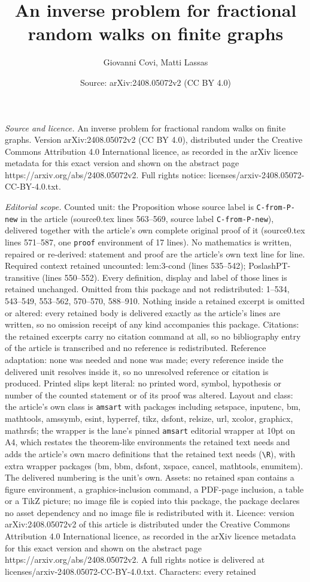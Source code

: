 \documentclass[10pt,a4paper]{amsart}
\title[An inverse problem for fractional random walks on finite gra]{An inverse problem for fractional random walks on finite graphs}
\author{Giovanni Covi, Matti Lassas}
\date{Source: arXiv:2408.05072v2 (CC BY 4.0)}
\begin{document}
\maketitle

\noindent\emph{Source and licence.} An inverse problem for fractional random walks on finite graphs. Version arXiv:2408.05072v2 (CC BY 4.0), distributed under the Creative Commons Attribution 4.0 International licence, as recorded in the arXiv licence metadata for this exact version and shown on the abstract page https://arxiv.org/abs/2408.05072v2. Full rights notice: licenses/arxiv-2408.05072-CC-BY-4.0.txt.\par\smallskip

\noindent\textit{Editorial scope.} Counted unit: the Proposition whose source label is \texttt{C-from-P-new} in the article (source0.tex lines 563--569, source label \texttt{C-from-P-new}), delivered together with the article's own complete original proof of it (source0.tex lines 571--587, one \texttt{proof} environment of 17 lines). No mathematics is written, repaired or re-derived: statement and proof are the article's own text line for line. Required context retained uncounted: lem:3-cond (lines 535--542); PoslashPT-transitive (lines 550--552). Every definition, display and label of those lines is retained unchanged. Omitted from this package and not redistributed: 1--534, 543--549, 553--562, 570--570, 588--910. Nothing inside a retained excerpt is omitted or altered: every retained body is delivered exactly as the article's lines are written, so no omission receipt of any kind accompanies this package. Citations: the retained excerpts carry no citation command at all, so no bibliography entry of the article is transcribed and no reference is redistributed. Reference adaptation: none was needed and none was made; every reference inside the delivered unit resolves inside it, so no unresolved reference or citation is produced. Printed slips kept literal: no printed word, symbol, hypothesis or number of the counted statement or of its proof was altered. Layout and class: the article's own class is \texttt{amsart} with packages including setspace, inputenc, bm, mathtools, amssymb, esint, hyperref, tikz, dsfont, relsize, url, xcolor, graphicx, mathrsfs; the wrapper is the lane's pinned \texttt{amsart} editorial wrapper at 10pt on A4, which restates the theorem-like environments the retained text needs and adds the article's own macro definitions that the retained text needs (\texttt{\textbackslash R}), with extra wrapper packages (bm, bbm, dsfont, xspace, cancel, mathtools, enumitem). The delivered numbering is the unit's own. Assets: no retained span contains a figure environment, a graphics-inclusion command, a PDF-page inclusion, a table or a TikZ picture; no image file is copied into this package, the package declares no asset dependency and no image file is redistributed with it. Licence: version arXiv:2408.05072v2 of this article is distributed under the Creative Commons Attribution 4.0 International licence, as recorded in the arXiv licence metadata for this exact version and shown on the abstract page https://arxiv.org/abs/2408.05072v2. A full rights notice is delivered at licenses/arxiv-2408.05072-CC-BY-4.0.txt. Characters: every retained 
\end{document}
